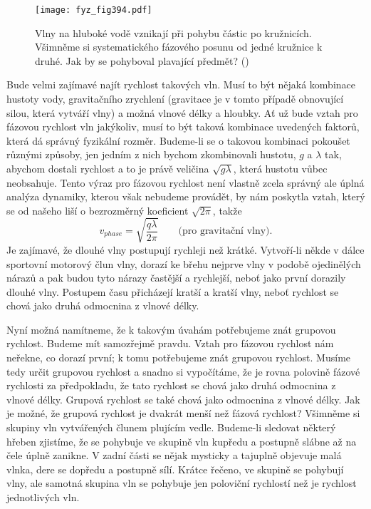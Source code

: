   \begin{figure}[ht!] %
    \centering
    \texttt{[image: fyz\_fig394.pdf]}
    \caption{Vlny na hluboké vodě vznikají při pohybu částic po kružnicích. Všimněme si 
             systematického fázového posunu od jedné kružnice k druhé. Jak by se pohyboval 
             plavající předmět?
             (\cite[s.~695]{Feynman01})}
    \label{fyz:fig394}
  \end{figure}

  Bude velmi zajímavé najít rychlost takových vln. Musí to být nějaká kombinace hustoty vody, 
  gravitačního zrychlení (gravitace je v tomto případě obnovující silou, která vytváří vlny) a 
  možná vlnové délky a hloubky. Ať už bude vztah pro fázovou rychlost vln jakýkoliv, musí to být 
  taková kombinace uvedených faktorů, která dá správný fyzikální rozměr. Budeme-li se o takovou 
  kombinaci pokoušet různými způsoby, jen jedním z nich bychom zkombinovali hustotu, \(g\) a 
  \(\lambda\) tak, abychom dostali rychlost a to je právě veličina \(\sqrt{g\lambda}\), která 
  hustotu vůbec neobsahuje. Tento výraz pro fázovou rychlost není vlastně zcela správný ale úplná 
  analýza dynamiky, kterou však nebudeme provádět, by nám poskytla vztah, který se od našeho liší o 
  bezrozměrný koeficient \(\sqrt{2\pi}\), takže
  \begin{equation*}
    v_{phase} = \sqrt{\dfrac{q\lambda}{2\pi}} \qquad\text{(pro gravitační vlny)}.
  \end{equation*}
  Je zajímavé, že dlouhé vlny postupují rychleji než krátké. Vytvoří-li někde v dálce sportovní 
  motorový člun vlny, dorazí ke břehu nejprve vlny v podobě ojedinělých nárazů a pak budou tyto 
  nárazy častější a rychlejší, neboť jako první dorazily dlouhé vlny. Postupem času přicházejí 
  kratší a kratší vlny, neboť rychlost se chová jako druhá odmocnina z vlnové délky.
  
  Nyní možná namítneme, že k takovým úvahám potřebujeme znát grupovou rychlost. Budeme mít 
  samozřejmě pravdu. Vztah pro fázovou rychlost nám neřekne, co dorazí první; k tomu potřebujeme 
  znát grupovou rychlost. Musíme tedy určit grupovou rychlost a snadno si vypočítáme, že je rovna 
  polovině fázové rychlosti za předpokladu, že tato rychlost se chová jako druhá odmocnina z vlnové 
  délky. Grupová rychlost se také chová jako odmocnina z vlnové délky. Jak je možné, že grupová 
  rychlost je dvakrát menší než fázová rychlost? Všimněme si skupiny vln vytvářených člunem 
  plujícím vedle. Budeme-li sledovat některý hřeben zjistíme, že se pohybuje ve skupině vln kupředu 
  a postupně slábne až na čele úplně zanikne. V zadní části se nějak mysticky a tajuplně objevuje 
  malá vlnka, dere se dopředu a postupně sílí. Krátce řečeno, ve skupině se pohybují vlny, ale 
  samotná skupina vln se pohybuje jen poloviční rychlostí než je rychlost jednotlivých vln.
  
